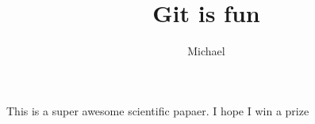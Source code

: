 \documentclass[10pt]{article}
\author{Michael}
\title{Git is fun}
\begin{document}
		\maketitle
		
		This is a super awesome scientific papaer.
		I hope I win a prize
		
\end{document}
